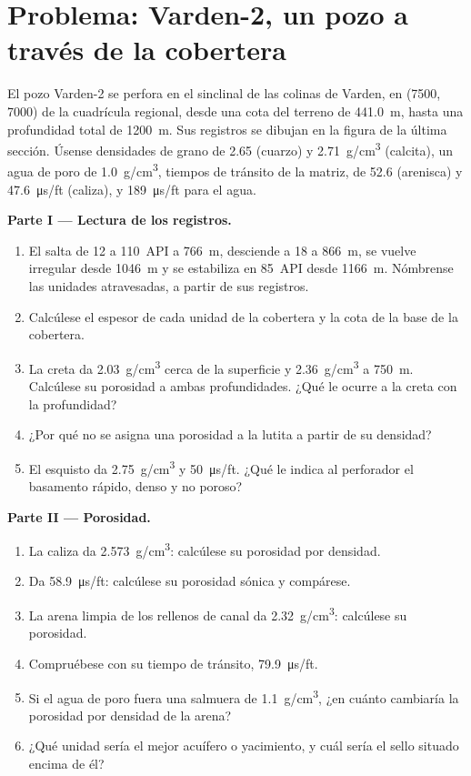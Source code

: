 \section{Problema: Varden-2, un pozo a través de la cobertera}

\begin{problem}
\label{pb:b3:facies-models:1}
El pozo Varden-2 se perfora en el sinclinal de las colinas de Varden, en
(7500, 7000) de la cuadrícula regional, desde una cota del terreno de
\qty{441.0}{m}, hasta una profundidad total de \qty{1200}{m}. Sus registros se dibujan en la
figura de la última sección. Úsense densidades de grano de 2.65 (cuarzo) y
\qty{2.71}{g/cm^3} (calcita), un agua de poro de \qty{1.0}{g/cm^3}, tiempos de tránsito de la matriz,
de 52.6 (arenisca) y \qty{47.6}{\micro\second/ft}
(caliza), y \qty{189}{\micro\second/ft} para el agua.

\medskip\noindent\textbf{Parte I --- Lectura de los registros.}
\begin{enumerate}
\item El  salta de 12 a \qty{110}{API} a \qty{766}{m}, desciende
  a 18 a \qty{866}{m}, se vuelve irregular desde \qty{1046}{m} y se estabiliza en
  \qty{85}{API} desde \qty{1166}{m}. Nómbrense las unidades atravesadas, a partir de sus registros.
\item Calcúlese el espesor de cada unidad de la cobertera y la cota de
  la base de la cobertera.
\item La creta da \qty{2.03}{g/cm^3} cerca de la superficie y
  \qty{2.36}{g/cm^3} a \qty{750}{m}. Calcúlese su porosidad a ambas profundidades.
  ¿Qué le ocurre a la creta con la profundidad?
\item ¿Por qué no se asigna una porosidad a la lutita a partir de su densidad?
\item El esquisto da \qty{2.75}{g/cm^3} y \qty{50}{\micro\second/ft}.
  ¿Qué le indica al perforador el basamento rápido, denso y no poroso?
\end{enumerate}

\medskip\noindent\textbf{Parte II --- Porosidad.}
\begin{enumerate}[resume]
\item La caliza da \qty{2.573}{g/cm^3}: calcúlese su porosidad por densidad.
\item Da \qty{58.9}{\micro\second/ft}: calcúlese su porosidad sónica y
  compárese.
\item La arena limpia de los rellenos de canal da \qty{2.32}{g/cm^3}: calcúlese
  su porosidad.
\item Compruébese con su tiempo de tránsito, \qty{79.9}{\micro\second/ft}.
\item Si el agua de poro fuera una salmuera de \qty{1.1}{g/cm^3}, ¿en cuánto cambiaría
  la porosidad por densidad de la arena?
\item ¿Qué unidad sería el mejor acuífero o yacimiento, y cuál sería el
  sello situado encima de él?
\end{enumerate}


\end{problem}
